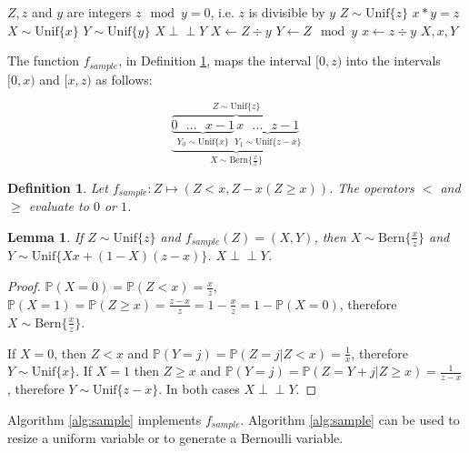 \documentclass[lettersize,journal]{IEEEtran}
\newtheorem{lemma}{Lemma}
\newtheorem{definition}{Definition}
\newcommand{\indep}{\perp\!\!\!\perp}
\newcommand{\unif}[1]{\mathrm{Unif}\{#1\}}
\newcommand{\bern}[1]{\mathrm{Bern}\{#1\}}
\newcommand{\Prob}{\mathbb{P}}
\newcommand{\prob}[1]{\Prob(#1)}
\begin{document}
\begin{algorithm}
\caption{Converting a uniform variable into two uniform variables by division}
\label{alg:divide}
\begin{algorithmic}[1]
    \Require $Z, z$ and $y$ are integers
    \Require $z \mod y = 0$, i.e. $z$ is divisible by $y$
    \Require $Z \sim \unif{z}$
    \Ensure $x * y = z$
    \Ensure $X \sim \unif{x}$
    \Ensure $Y \sim \unif{y}$
    \Ensure $X \indep Y$
  \State $X \gets Z \div y$
  \State $Y \gets Z \mod y$
  \State $x \gets z \div y$
  \State \Return $X, x, Y$
\EndProcedure
\end{algorithmic}
\end{algorithm}

The function $f_{sample}$, in Definition \ref{def:sample}, maps the interval $[0,z)$ into the intervals $[0,x)$ and $[x, z)$ as follows:

\[
\overbrace{
    \underbrace{
        \underbrace{0 \text{   } ... \text{   } x-1}_{Y_0 \sim \unif{x}}
        \underbrace{x \text{   } ... \text{   } z-1}_{Y_1 \sim \unif{z-x}}}
    }_{X \sim \bern{\frac{x}{z}}}^{Z \sim \unif{z}}
\]

\begin{definition}
Let $f_{sample}: Z \mapsto (Z<x, Z - x(Z\ge x))$. The operators $<$ and $\ge$ evaluate to $0$ or $1$.
\label{def:sample}
\end{definition}

\begin{lemma}
If $Z \sim \unif{z}$ and $f_{sample}(Z) = (X,Y)$, then $X \sim \bern{\frac{x}{z}}$ and $Y \sim \unif{Xx + (1-X)(z-x)}$. $X \indep Y$.
\label{lem:sample}
\end{lemma}

\begin{proof}
    $\prob{X=0} = \prob{Z < x} = \frac{x}{z}$, $\prob{X=1} = \prob{Z \ge x} = \frac{z-x}{z} = 1 - \frac{x}{z} = 1 - \prob{X=0}$, therefore $X \sim \bern{\frac{x}{z}}$.

    If $X=0$, then $Z<x$ and $\prob{Y=j} = \prob{Z=j | Z<x} = \frac{1}{x}$, therefore $Y \sim \unif{x}$. If $X=1$ then $Z\ge x$ and $\prob{Y=j} = \prob{Z = Y + j| Z\ge x} = \frac{1}{z-x}$, therefore $Y \sim \unif{z-x}$. In both cases $X \indep Y$.
\end{proof}

Algorithm \ref{alg:sample} implements $f_{sample}$. Algorithm \ref{alg:sample} can be used to resize a uniform variable or to generate a Bernoulli variable.
\end{document}
